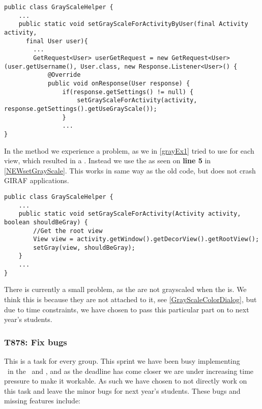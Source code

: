 \begin{minipage}[H]{\linewidth}
\begin{lstlisting}[caption = Finds the grayscale setting for each user, label =
NEWsetGrayScaleUser] 
public class GrayScaleHelper {
	...
	public static void setGrayScaleForActivityByUser(final Activity activity, 
	  final User user){
		...
		GetRequest<User> userGetRequest = new GetRequest<User>(user.getUsername(), User.class, new Response.Listener<User>() {
            @Override
            public void onResponse(User response) {
           		if(response.getSettings() != null) {
               		setGrayScaleForActivity(activity, response.getSettings().getUseGrayScale());
               	}
	 			...
}
\end{lstlisting}
\end{minipage}

In the  method we experience a problem, as we in
\autoref{grayEx1} tried to use  for each view, which resulted in
a . Instead we use the  as seen on
\textbf{line 5} in \autoref{NEWsetGrayScale}. This works in same way as the
old code, but does not crash GIRAF applications.\nl

\begin{minipage}[H]{\linewidth}
\begin{lstlisting}[caption = The root View is used instead of all the seperate
views, label = NEWsetGrayScale] 
public class GrayScaleHelper {
	...
    public static void setGrayScaleForActivity(Activity activity, boolean shouldBeGray) {
        //Get the root view
        View view = activity.getWindow().getDecorView().getRootView();
        setGray(view, shouldBeGray);
    }
    ...
}
\end{lstlisting}
\end{minipage}

There is currently a small problem, as the  are not grayscaled
when the  is. We think this is because they are not attached to
it, see \autoref{GrayScaleColorDialog}, but due to time constraints, we have
chosen to pass this particular part on to next year's students.


\subsubsection{T878: Fix bugs}\label{T878}
This is a task for every group. This sprint we have been busy implementing\\
\rlib\ in the \lapp\ and \clib, and as the deadline has come closer we are under
increasing time pressure to make it workable. As such we have chosen to not
directly work on this task and leave the minor bugs for next year's students.
These bugs and missing features include:

